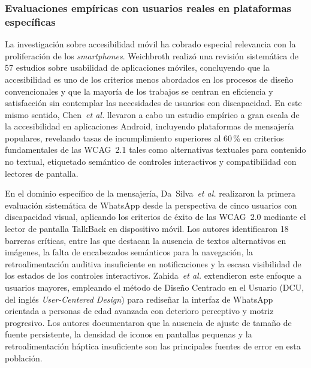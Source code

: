 \documentclass[journal]{IEEEtran}
\begin{document}
\subsubsection{Evaluaciones emp\'iricas con usuarios reales en plataformas espec\'ificas}

La investigaci\'on sobre accesibilidad m\'ovil ha cobrado especial relevancia con la proliferaci\'on de los \textit{smartphones}. Weichbroth \cite{weichbroth2020} realiz\'o una revisi\'on sistem\'atica de 57 estudios sobre usabilidad de aplicaciones m\'oviles, concluyendo que la accesibilidad es uno de los criterios menos abordados en los procesos de dise\~no convencionales y que la mayor\'ia de los trabajos se centran en eficiencia y satisfacci\'on sin contemplar las necesidades de usuarios con discapacidad. En este mismo sentido, Chen~\textit{et al.} \cite{chen2022} llevaron a cabo un estudio emp\'irico a gran escala de la accesibilidad en aplicaciones Android, incluyendo plataformas de mensajer\'ia populares, revelando tasas de incumplimiento superiores al 60\,\% en criterios fundamentales de las WCAG~2.1 tales como alternativas textuales para contenido no textual, etiquetado sem\'antico de controles interactivos y compatibilidad con lectores de pantalla.

En el dominio espec\'ifico de la mensajer\'ia, Da~Silva~\textit{et al.} \cite{dasilva2016} realizaron la primera evaluaci\'on sistem\'atica de WhatsApp desde la perspectiva de cinco usuarios con discapacidad visual, aplicando los criterios de \'exito de las WCAG~2.0 mediante el lector de pantalla TalkBack en dispositivo m\'ovil. Los autores identificaron 18 barreras cr\'iticas, entre las que destacan la ausencia de textos alternativos en im\'agenes, la falta de encabezados sem\'anticos para la navegaci\'on, la retroalimentaci\'on auditiva insuficiente en notificaciones y la escasa visibilidad de los estados de los controles interactivos. Zahida~\textit{et al.} \cite{zahida2021} extendieron este enfoque a usuarios mayores, empleando el m\'etodo de Dise\~no Centrado en el Usuario (DCU, del ingl\'es \textit{User-Centered Design}) para redise\~nar la interfaz de WhatsApp orientada a personas de edad avanzada con deterioro perceptivo y motriz progresivo. Los autores documentaron que la ausencia de ajuste de tama\~no de fuente persistente, la densidad de iconos en pantallas pequenas y la retroalimentaci\'on h\'aptica insuficiente son las principales fuentes de error en esta poblaci\'on.
\end{document}
